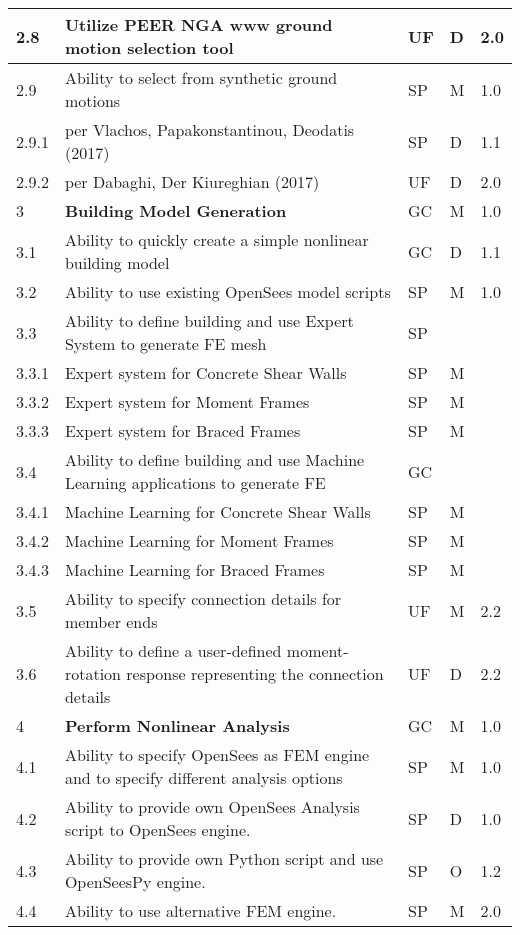 \begin{longtable}{| p{} | p{} | p{} | p{} |  p{} |}
      2.8 & Utilize PEER NGA www ground motion selection tool  & UF & D & 2.0 \\ \hline
      2.9 & Ability to select from synthetic ground motions & SP & M & 1.0  \\
      2.9.1 & per Vlachos, Papakonstantinou, Deodatis (2017) & SP & D & 1.1  \\ 
      2.9.2 & per Dabaghi, Der Kiureghian (2017) & UF & D & 2.0 \\ \hline
	3 & \textbf{Building Model Generation} & GC & M & 1.0 \\ \hline
	3.1 & Ability to quickly create a simple nonlinear building model & GC & D & 1.1 \\ \hline
	3.2 & Ability to use existing OpenSees model scripts & SP & M & 1.0 \\ \hline
	3.3  & Ability to define building and use Expert System to generate FE mesh & SP & &  \\ \hline
	3.3.1 & Expert system for Concrete Shear Walls & SP & M &  \\ \hline
	3.3.2 & Expert system for Moment Frames & SP & M &  \\ \hline
	3.3.3 & Expert system for  Braced Frames & SP & M &   \\ \hline
	3.4 & Ability to define building and use Machine Learning applications to generate FE & GC &  &  \\ \hline
	3.4.1 & Machine Learning for Concrete Shear Walls & SP & M &  \\ \hline
	3.4.2 & Machine Learning for Moment Frames & SP & M &  \\ \hline
	3.4.3 & Machine Learning for Braced Frames & SP & M &   \\ \hline
	3.5 & Ability to specify connection details for member ends & UF & M & 2.2 \\ \hline
	3.6 & Ability to define a user-defined moment-rotation response representing the connection details & UF & D & 2.2 \\ \hline
	4 & \textbf{Perform Nonlinear Analysis} & GC & M & 1.0 \\ \hline
	4.1 & Ability to specify OpenSees as FEM engine and to specify different analysis options & SP & M & 1.0 \\ \hline
	4.2 & Ability to provide own OpenSees Analysis script to OpenSees engine. & SP & D & 1.0 \\ \hline
	4.3 & Ability to provide own Python script and use OpenSeesPy engine. & SP & O & 1.2 \\ \hline
	4.4 & Ability to use alternative FEM engine. & SP & M & 2.0 \\ \hline

\end{longtable}
